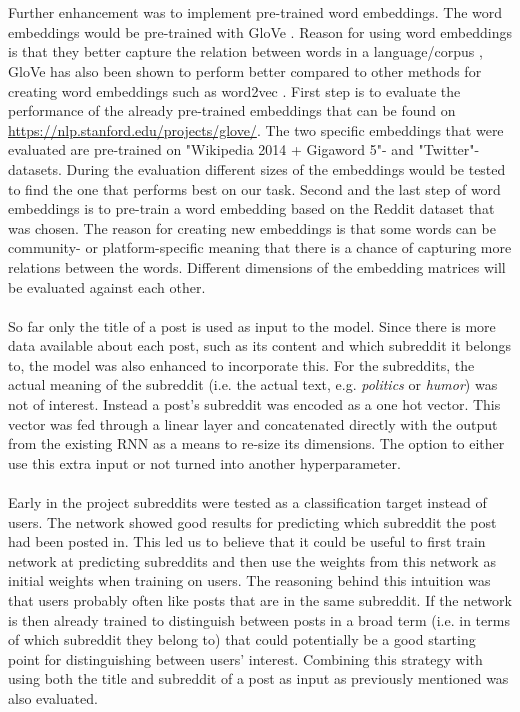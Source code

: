 \\\\
Further enhancement was to implement pre-trained word embeddings. The word embeddings would be pre-trained with GloVe \parencite{pennington2014glove}. Reason for using word embeddings is that they better capture the relation between words in a language/corpus \parencite{mikolov2013linguistic}, GloVe has also been shown to perform better compared to other methods for creating word embeddings such as word2vec \parencite{pennington2014glove}. First step is to evaluate the performance of the already pre-trained embeddings that can be found on \url{https://nlp.stanford.edu/projects/glove/}. The two specific embeddings that were evaluated are pre-trained on "Wikipedia 2014 + Gigaword 5"- and "Twitter"-datasets. During the evaluation different sizes of the embeddings would be tested to find the one that performs best on our task. Second and the last step of word embeddings is to pre-train a word embedding based on the Reddit dataset that was chosen. 
The reason for creating new embeddings is that some words can be community- or platform-specific meaning that there is a chance of capturing more relations between the words. Different dimensions of the embedding matrices will be evaluated against each other. 
\\\\
So far only the title of a post is used as input to the model. Since there is more data available about each post, such as its content and which subreddit it belongs to, the model was also enhanced to incorporate this. For the subreddits, the actual meaning of the subreddit (i.e. the actual text, e.g. \textit{politics} or \textit{humor}) was not of interest. Instead a post's subreddit was encoded as a one hot vector. This vector was fed through a linear layer and concatenated directly with the output from the existing RNN as a means to re-size its dimensions. The option to either use this extra input or not turned into another hyperparameter.
\\\\
Early in the project subreddits were tested as a classification target instead of users. The network showed good results for predicting which subreddit the post had been posted in. This led us to believe that it could be useful to first train network at predicting subreddits and then use the weights from this network as initial weights when training on users. The reasoning behind this intuition was that users probably often like posts that are in the same subreddit. If the network is then already trained to distinguish between posts in a broad term (i.e. in terms of which subreddit they belong to) that could potentially be a good starting point for distinguishing between users' interest. Combining this strategy with using both the title and subreddit of a post as input as previously mentioned was also evaluated.

